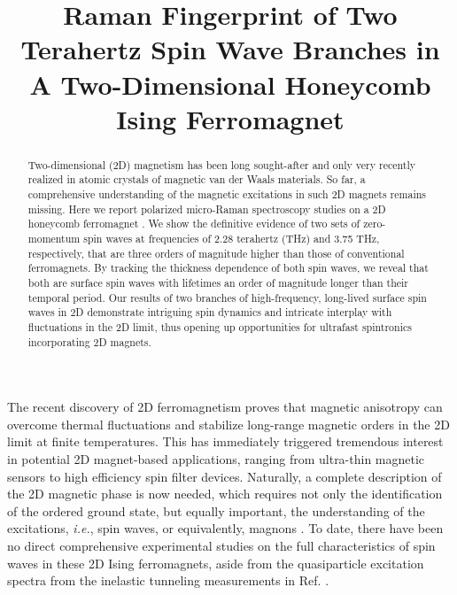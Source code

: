 \documentclass[prl, preprint, superscriptaddress]{revtex4-1}
\begin{document}
\widetext


\title{Raman Fingerprint of Two Terahertz Spin Wave Branches in A Two-Dimensional Honeycomb Ising Ferromagnet}



\begin{abstract}
\noindent Two-dimensional (2D) magnetism has been long sought-after and only very recently realized in atomic crystals of magnetic van der Waals materials. So far, a comprehensive understanding of the magnetic excitations in such 2D magnets remains missing. Here we report polarized micro-Raman spectroscopy studies on a 2D honeycomb ferromagnet . We show the definitive evidence of two sets of zero-momentum spin waves at frequencies of 2.28 terahertz (THz) and 3.75 THz, respectively, that are three orders of magnitude higher than those of conventional ferromagnets. By tracking the thickness dependence of both spin waves, we reveal that both are surface spin waves with lifetimes an order of magnitude longer than their temporal period. Our results of two branches of high-frequency, long-lived surface spin waves in 2D  demonstrate intriguing spin dynamics and intricate interplay with fluctuations in the 2D limit, thus opening up opportunities for ultrafast spintronics incorporating 2D magnets.
\end{abstract}

\maketitle

The recent discovery of 2D ferromagnetism \cite{Gong2017, Huang2017} proves that magnetic anisotropy can overcome thermal fluctuations and stabilize long-range magnetic orders in the 2D limit at finite temperatures. This has immediately triggered tremendous interest \cite{Zhong2017, Seyler2018, Huang2018Electrical, Jiang2018Electric, Wang2018Very, Song2018, Deng2018, Jiang2018Controlling, Klein2018, Kim2018} in potential 2D magnet-based applications, ranging from ultra-thin magnetic sensors to high efficiency spin filter devices. Naturally, a complete description of the 2D magnetic phase is now needed, which requires not only the identification of the ordered ground state, but equally important, the understanding of the excitations, \textit{i.e.}, spin waves, or equivalently, magnons \cite{Herring1951, Patton1984}. To date, there have been no direct comprehensive experimental studies on the full characteristics of spin waves in these 2D Ising ferromagnets, aside from the quasiparticle excitation spectra from the inelastic tunneling measurements in Ref. \cite{Klein2018}.  
\end{document}
